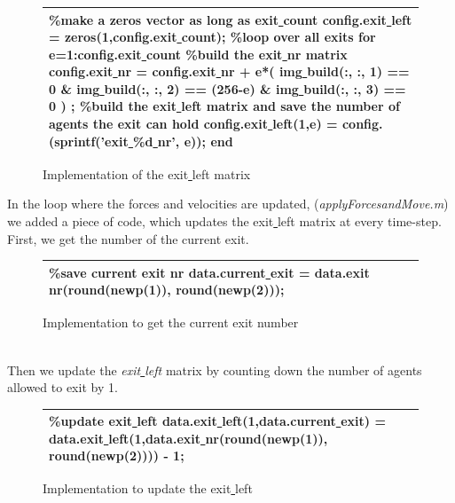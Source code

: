 \documentclass[11pt]{article}
\begin{document}
\begin{figure}[H]
\centering
\begin{tabular}
{|>{\large}m{\textwidth}|} \hline
\bigskip
\textcolor{commentcolor}{\%make a zeros vector as long as exit\underline{ }count}
\newline
config.exit\underline{ }left = zeros(1,config.exit\underline{ }count);
\newline
\textcolor{commentcolor}{\%loop over all exits}
\newline
\textcolor{keywordcolor}{for} e=1:config.exit\underline{ }count
\newline
\textcolor{commentcolor}{\%build the exit\underline{ }nr matrix}
\newline
config.exit\underline{ }nr = config.exit\underline{ }nr + e*( img\underline{ }build(:, :, 1) == 0 \& img\underline{ }build(:, :, 2) == (256-e) \& img\underline{ }build(:, :, 3) == 0 ) ;
\newline
\textcolor{commentcolor}{\%build the exit\underline{ }left matrix and save the number of agents the exit can hold}
\newline
config.exit\underline{ }left(1,e) = config.(sprintf(\textcolor{stringcolor}{'exit\underline{ }\%d\underline{ }nr'}, e)); 
\newline
\textcolor{keywordcolor}{end}
\bigskip
\\ \hline
\end{tabular}
\caption{Implementation of the exit\underline{ }left matrix}
\end{figure}
\bigskip
In the loop where the forces and velocities are updated, (\textit{applyForcesandMove.m}) we added a piece of code, which updates the exit\underline{ }left matrix at every time-step.
\newline
First, we get the number of the current exit.
\begin{figure}[h!]
\centering
\begin{tabular}
{|>{\large}m{\textwidth}|} \hline
\bigskip
\textcolor{commentcolor}{\%save current exit nr}
\newline
data.current\underline{ }exit = data.exit\underline{ }nr(round(newp(1)), round(newp(2)));
\bigskip
\\ \hline
\end{tabular}
\caption{Implementation to get the current exit number}
\end{figure}
\\
Then we update the \textit{exit\underline{ }left} matrix by counting down the number of agents allowed to exit by 1. 
\begin{figure}[h!]
\centering
\begin{tabular}
{|>{\large}m{\textwidth}|} \hline
\bigskip
\textcolor{commentcolor}{\%update exit\underline{ }left}
\newline
data.exit\underline{ }left(1,data.current\underline{ }exit) = data.exit\underline{ }left(1,data.exit\underline{ }nr(round(newp(1)), round(newp(2)))) - 1;
\bigskip
\\ \hline
\end{tabular}
\caption{Implementation to update the exit\underline{ }left}
\end{figure}
\end{document}
